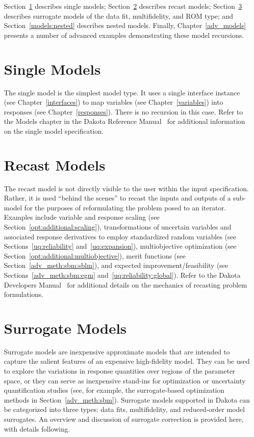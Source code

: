 Section~\ref{models:single} describes single models;
Section~\ref{models:recast} describes recast models;
Section~\ref{models:surrogate} describes surrogate models of the data
fit, multifidelity, and ROM type; and Section~\ref{models:nested}
describes nested models.  Finally, Chapter~\ref{adv_models} presents
a number of advanced examples demonstrating these model recursions.

\section{Single Models}\label{models:single}

The single model is the simplest model type.  It uses a single
interface instance (see Chapter~\ref{interfaces}) to map variables
(see Chapter~\ref{variables}) into responses (see
Chapter~\ref{responses}).  There is no recursion in this case.  Refer
to the Models chapter in the Dakota Reference Manual~\cite{RefMan} for
additional information on the single model specification.

\section{Recast Models}\label{models:recast}

The recast model is not directly visible to the user within the input
specification.  Rather, it is used ``behind the scenes'' to recast the
inputs and outputs of a sub-model for the purposes of reformulating
the problem posed to an iterator.  Examples include variable and
response scaling (see Section~\ref{opt:additional:scaling}),
transformations of uncertain variables and associated response
derivatives to employ standardized random variables (see
Sections~\ref{uq:reliability} and~\ref{uq:expansion}), multiobjective
optimization (see Section~\ref{opt:additional:multiobjective}), merit
functions (see Section~\ref{adv_meth:sbm:sblm}), and expected
improvement/feasibility (see Sections~\ref{adv_meth:sbm:egm}
and~\ref{uq:reliability:global}).  Refer to the Dakota Developers
Manual~\cite{DevMan} for additional details on the mechanics of
recasting problem formulations.

\section{Surrogate Models}\label{models:surrogate}

Surrogate models are inexpensive approximate models that are intended
to capture the salient features of an expensive high-fidelity model.
They can be used to explore the variations in response quantities over
regions of the parameter space, or they can serve as inexpensive
stand-ins for optimization or uncertainty quantification studies (see,
for example, the surrogate-based optimization methods in
Section~\ref{adv_meth:sbm}).  Surrogate models supported in Dakota can be
categorized into three types: data fits, multifidelity, and
reduced-order model surrogates.  An overview and discussion of
surrogate correction is provided here, with details following.


